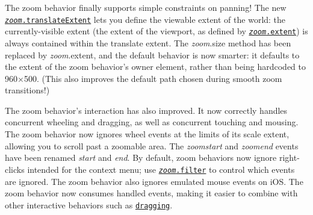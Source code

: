 The zoom behavior finally supports simple constraints on panning! The new \href{https://github.com/d3/d3-zoom/blob/master/README.md#zoom_translateExtent}{\tt {\itshape zoom}.translate\+Extent} lets you define the viewable extent of the world\+: the currently-\/visible extent (the extent of the viewport, as defined by \href{https://github.com/d3/d3-zoom/blob/master/README.md#zoom_extent}{\tt {\itshape zoom}.extent}) is always contained within the translate extent. The {\itshape zoom}.size method has been replaced by {\itshape zoom}.extent, and the default behavior is now smarter\+: it defaults to the extent of the zoom behavior’s owner element, rather than being hardcoded to 960×500. (This also improves the default path chosen during smooth zoom transitions!)

The zoom behavior’s interaction has also improved. It now correctly handles concurrent wheeling and dragging, as well as concurrent touching and mousing. The zoom behavior now ignores wheel events at the limits of its scale extent, allowing you to scroll past a zoomable area. The {\itshape zoomstart} and {\itshape zoomend} events have been renamed {\itshape start} and {\itshape end}. By default, zoom behaviors now ignore right-\/clicks intended for the context menu; use \href{https://github.com/d3/d3-zoom/blob/master/README.md#zoom_filter}{\tt {\itshape zoom}.filter} to control which events are ignored. The zoom behavior also ignores emulated mouse events on i\+OS. The zoom behavior now consumes handled events, making it easier to combine with other interactive behaviors such as \href{#dragging-d3-drag}{\tt dragging}. 